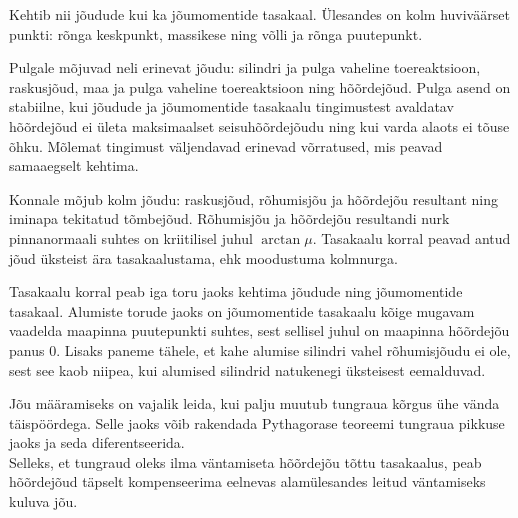 \documentclass[10pt, twoside]{article}
\begin{document}
{%

\hint
Kehtib nii jõudude kui ka jõumomentide tasakaal. Ülesandes on kolm huviväärset punkti: rõnga keskpunkt, massikese ning võlli ja rõnga puutepunkt.
\probend
\bigskip


\hint
Pulgale mõjuvad neli erinevat jõudu: silindri ja pulga vaheline toereaktsioon, raskusjõud, maa ja pulga vaheline toereaktsioon ning hõõrdejõud. Pulga asend on stabiilne, kui jõudude ja jõumomentide tasakaalu tingimustest avaldatav hõõrdejõud ei ületa maksimaalset seisuhõõrdejõudu ning kui varda alaots ei tõuse õhku. Mõlemat tingimust väljendavad erinevad võrratused, mis peavad samaaegselt kehtima.
\probend
\bigskip


\hint
Konnale mõjub kolm jõudu: raskusjõud, rõhumisjõu ja hõõrdejõu resultant ning iminapa tekitatud tõmbejõud. Rõhumisjõu ja hõõrdejõu resultandi nurk pinnanormaali suhtes on kriitilisel juhul $\arctan \mu$. Tasakaalu korral peavad antud jõud üksteist ära tasakaalustama, ehk moodustuma kolmnurga.
\probend
\bigskip


\hint
Tasakaalu korral peab iga toru jaoks kehtima jõudude ning jõumomentide tasakaal. Alumiste torude jaoks on jõumomentide tasakaalu kõige mugavam vaadelda maapinna puutepunkti suhtes, sest sellisel juhul on maapinna hõõrdejõu panus \num{0}. Lisaks paneme tähele, et kahe alumise silindri vahel rõhumisjõudu ei ole, sest see kaob niipea, kui alumised silindrid natukenegi üksteisest eemalduvad.
\probend
\bigskip


\hint
\osa Jõu määramiseks on vajalik leida, kui palju muutub tungraua kõrgus ühe vända täispöördega. Selle jaoks võib rakendada Pythagorase teoreemi tungraua pikkuse jaoks ja seda diferentseerida.\\
\osa Selleks, et tungraud oleks ilma väntamiseta hõõrdejõu tõttu tasakaalus, peab hõõrdejõud täpselt kompenseerima eelnevas alamülesandes leitud väntamiseks kuluva jõu.
\probend
\bigskip

}
\end{document}
